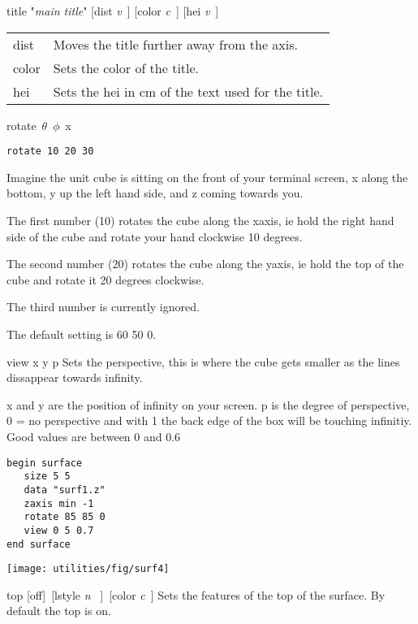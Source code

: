 \begin{commanddescription}
\item[{\sf title "{\it main title}"  [dist {\it v}\ ] [color {\it c}\ ] 
[hei {\it v}\ ] }]

\begin{tabular}{ll}	
dist   & Moves the title further away from the axis.\\
color  & Sets the color of the title.\\
hei    & Sets the hei in cm of the text used for the title.\\
\end{tabular}

\item[{\sf rotate\  $\theta$\  $\phi$\  x }]
\begin{verbatim}
rotate 10 20 30
\end{verbatim}
Imagine the unit cube is sitting on the front of your
terminal screen, x along the bottom, y up the left hand
side, and z coming towards you.

The first number (10) rotates the cube along the xaxis, ie
hold the right hand side of the cube and rotate your hand
clockwise 10 degrees.

The second number (20) rotates the cube along the yaxis, ie
hold the top of the cube and rotate it 20 degrees clockwise.

The third number is currently ignored.

The default setting is 60 50 0.

\item[{\sf view x y p }]
Sets the perspective, this is where the cube gets smaller
as the lines dissappear towards infinity.

x and y are the position of infinity on your screen.
p is the degree of perspective, 0 = no perspective
and with 1 the back edge of the box will be touching
infinitiy.  Good values are between 0 and 0.6

\begin{minipage}[c]{8cm}
\begin{Verbatim}
begin surface
   size 5 5
   data "surf1.z"
   zaxis min -1
   rotate 85 85 0
   view 0 5 0.7
end surface
\end{Verbatim}
\end{minipage}
\hfill
\begin{minipage}[c]{7cm}
\mbox{\texttt{[image: utilities/fig/surf4]}}
\end{minipage}

\item[{\sf top [off]\ [lstyle {\it n} \ ]\ [color {\it c}\ ] }]
Sets the features of the top of the surface.
By default the top is on.


\end{commanddescription}
